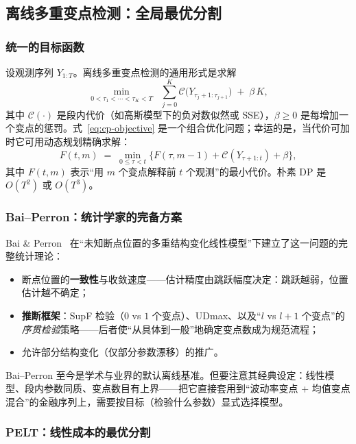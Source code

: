 \subsection{离线多重变点检测：全局最优分割}

\subsubsection{统一的目标函数}

设观测序列 $Y_{1:T}$。离线多重变点检测的通用形式是求解
\begin{equation}
\min_{0 < \tau_1 < \cdots < \tau_K < T} \;\; \sum_{j=0}^{K} \mathcal{C}\big(Y_{\tau_j+1 : \tau_{j+1}}\big) \;+\; \beta\, K,
\label{eq:cp-objective}
\end{equation}
其中 $\mathcal{C}(\cdot)$ 是段内代价（如高斯模型下的负对数似然或 SSE），$\beta \ge 0$ 是每增加一个变点的惩罚。式~\eqref{eq:cp-objective} 是一个组合优化问题；幸运的是，当代价可加时它可用动态规划精确求解：
\begin{equation}
F(t, m) \;=\; \min_{0 \le \tau < t}\Big\{ F(\tau, m-1) + \mathcal{C}(Y_{\tau+1:t}) + \beta \Big\},
\end{equation}
其中 $F(t, m)$ 表示“用 $m$ 个变点解释前 $t$ 个观测”的最小代价。朴素 DP 是 $O(T^2)$ 或 $O(T^3)$。

\subsubsection{Bai--Perron：统计学家的完备方案}

Bai \& Perron~\cite{bai1998} 在“未知断点位置的多重结构变化线性模型”下建立了这一问题的完整统计理论：
\begin{itemize}[itemsep=2pt]
\item 断点位置的\textbf{一致性}与收敛速度——估计精度由跳跃幅度决定：跳跃越弱，位置估计越不确定；
\item \textbf{推断框架}：SupF 检验（$0$ vs $1$ 个变点）、UDmax、以及“$l$ vs $l+1$ 个变点”的\emph{序贯检验}策略——后者使“从具体到一般”地确定变点数成为规范流程；
\item 允许部分结构变化（仅部分参数漂移）的推广。
\end{itemize}
Bai--Perron 至今是学术与业界的默认离线基准。但要注意其经典设定：线性模型、段内参数同质、变点数目有上界——把它直接套用到“波动率变点 + 均值变点混合”的金融序列上，需要按目标（检验什么参数）显式选择模型。

\subsubsection{PELT：线性成本的最优分割}

